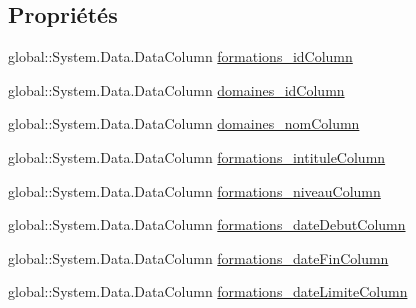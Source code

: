 \subsection*{Propriétés}
\begin{DoxyCompactItemize}
\item 
global\+::\+System.\+Data.\+Data\+Column \hyperlink{classforma_1_1formadb_data_set_1_1view__formations__domaines_data_table_a0fa5e3ab3e9f775bdeb88741a07710cd}{formations\+\_\+id\+Column}
\item 
global\+::\+System.\+Data.\+Data\+Column \hyperlink{classforma_1_1formadb_data_set_1_1view__formations__domaines_data_table_a270bc1633abdb1e34fa7bb1c76db2072}{domaines\+\_\+id\+Column}
\item 
global\+::\+System.\+Data.\+Data\+Column \hyperlink{classforma_1_1formadb_data_set_1_1view__formations__domaines_data_table_a17cd33a0d790c02cbd747efd41554b41}{domaines\+\_\+nom\+Column}
\item 
global\+::\+System.\+Data.\+Data\+Column \hyperlink{classforma_1_1formadb_data_set_1_1view__formations__domaines_data_table_aa2ccbc7524522c2594725c78569bf643}{formations\+\_\+intitule\+Column}
\item 
global\+::\+System.\+Data.\+Data\+Column \hyperlink{classforma_1_1formadb_data_set_1_1view__formations__domaines_data_table_a136c8e69ed20ca64701f30738cce3149}{formations\+\_\+niveau\+Column}
\item 
global\+::\+System.\+Data.\+Data\+Column \hyperlink{classforma_1_1formadb_data_set_1_1view__formations__domaines_data_table_a01f6bdb8a065c99d4ae94b84aa0002fd}{formations\+\_\+date\+Debut\+Column}
\item 
global\+::\+System.\+Data.\+Data\+Column \hyperlink{classforma_1_1formadb_data_set_1_1view__formations__domaines_data_table_ad3ffc45a5a4dee365fb4142074eccb02}{formations\+\_\+date\+Fin\+Column}
\item 
global\+::\+System.\+Data.\+Data\+Column \hyperlink{classforma_1_1formadb_data_set_1_1view__formations__domaines_data_table_adf8362859d7e62fc89d936bbb76eb19b}{formations\+\_\+date\+Limite\+Column}

\end{DoxyCompactItemize}
